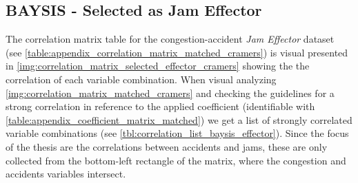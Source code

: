 \subsection{BAYSIS - Selected as Jam Effector}
\label{analysis_processing_correlation_baysis_effector}
The correlation matrix table for the congestion-accident \textit{Jam Effector} dataset (see \cref{table:appendix_correlation_matrix_matched_cramers}) is visual presented in \cref{img:correlation_matrix_selected_effector_cramers} showing the the correlation of each variable combination. When visual analyzing \cref{img:correlation_matrix_matched_cramers} and checking the guidelines for a strong correlation in reference to the applied coefficient (identifiable with \cref{table:appendix_coefficient_matrix_matched}) we get a list of strongly correlated variable combinations (see \cref{tbl:correlation_list_baysis_effector}). Since the focus of the thesis are the correlations between accidents and jams, these are only collected from the bottom-left rectangle of the matrix, where the congestion and accidents variables intersect.

